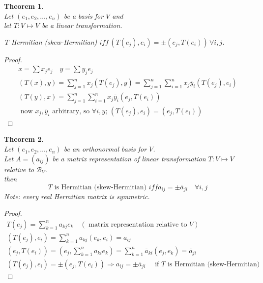 \documentclass[twoside]{amsart}
\theoremstyle{plain}
\newtheorem{theorem}{Theorem}
\theoremstyle{definition}
\begin{document}
\begin{theorem} \quad \\
Let $(e_1, e_2, \dots, e_n)$ be a basis for $V$ and \\
let $T:V \mapsto V$ be a linear transformation.  

T Hermitian (skew-Hermitian)  $iff \, (T(e_j), e_i) = \pm (e_j, T(e_i)) \, \forall i,j$.  
\end{theorem}
\begin{proof}
  \begin{gather*}
    x = \sum x_j e_j \quad y = \sum y_j e_j \\
    (T(x),y) = \sum_{j=1}^n x_j (T(e_j), y) = \sum_{j=1}^n \sum_{i=1}^n x_j \overline{y}_i (T(e_j), e_i) \\
    (T(y),x) = \sum_{j=1}^n \sum_{i=1}^n x_j \overline{y}_i (e_j, T(e_i)) \\
    \text{ now } x_j, \overline{y}_i \text{ arbitrary, so } \forall i,y; \, (T(e_j), e_i) = (e_j, T(e_i))
  \end{gather*}
\end{proof}

\begin{theorem} \quad \\
  Let $(e_1,e_2, \dots, e_n)$ be an orthonormal basis for $V$. \\
  Let $A=(a_{ij})$ be a matrix representation of linear transformation $T:V \mapsto V$ relative to $\mathcal{B}_V$.  \\
  \phantom{Let} then
  \[
T \text{ is Hermitian (skew-Hermitian) } iff a_{ij} = \pm \overline{a}_{ji} \quad \forall i,j
  \]
  Note: every real Hermitian matrix is symmetric.  
\end{theorem}
\begin{proof}
\begin{gather*}
  T(e_j) = \sum_{k=1}^n a_{kj} e_k \quad (\text{ matrix representation relative to } V)  \\
  (T(e_j),e_i) = \sum_{k=1}^n a_{kj} (e_k,e_i) = a_{ij} \\
  (e_j, T(e_i)) = (e_j, \sum_{k=1}^n a_{ki}e_k ) = \sum_{k=1}^n \overline{a}_{ki} (e_j, e_k) = \overline{a}_{ji} \\
  (T(e_j), e_i) = \pm (e_j, T(e_i)) \Longrightarrow a_{ij} = \pm \overline{a}_{ji} \quad \text{ if $T$ is Hermitian (skew-Hermitian) }
\end{gather*}
\end{proof}
\end{document}
